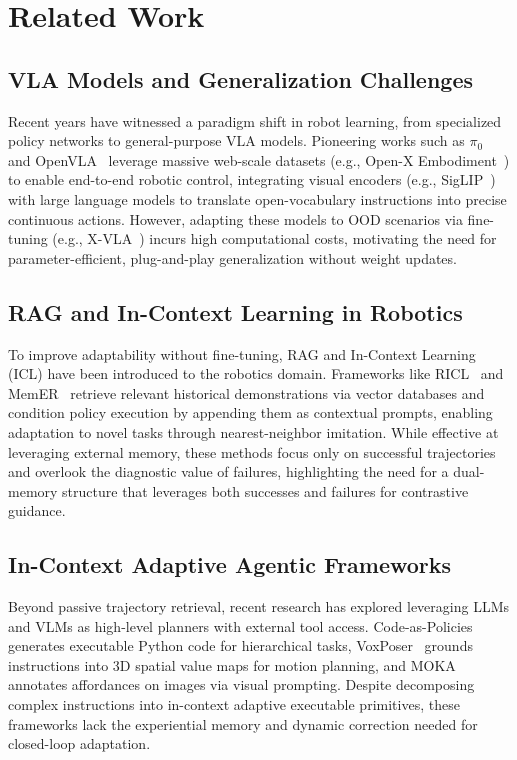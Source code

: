 \section{Related Work}%
\label{sec:related_work}


\subsection{VLA Models and Generalization Challenges}

Recent years have witnessed a paradigm shift in robot learning, from specialized policy networks to general-purpose VLA models.
Pioneering works such as $\pi_0$~\cite{pi0} and OpenVLA~\cite{openvla} leverage massive web-scale datasets 
(e.g., Open-X Embodiment~\cite{openx}) to enable end-to-end robotic control, 
integrating visual encoders (e.g., SigLIP~\cite{siglip}) with large language models 
to translate open-vocabulary instructions into precise continuous actions.
However, adapting these models to OOD scenarios via fine-tuning 
(e.g., X-VLA~\cite{xvla}) incurs high computational costs, 
motivating the need for parameter-efficient, plug-and-play generalization without weight updates.

\subsection{RAG and In-Context Learning in Robotics}

To improve adaptability without fine-tuning, RAG
and In-Context Learning (ICL) have been introduced to the robotics domain.
Frameworks like RICL~\cite{ricl} and MemER~\cite{memer} retrieve relevant historical demonstrations 
via vector databases and condition policy execution by appending them as contextual prompts, 
enabling adaptation to novel tasks through nearest-neighbor imitation.
While effective at leveraging external memory, these methods focus only on successful trajectories and overlook the diagnostic value of failures, highlighting the need for a dual-memory structure that leverages both successes and failures for contrastive guidance.

\subsection{In-Context Adaptive Agentic Frameworks}

Beyond passive trajectory retrieval, recent research has explored leveraging LLMs and 
VLMs as high-level planners with external tool access.
Code-as-Policies~\cite{cap} generates executable Python code for hierarchical tasks, 
VoxPoser~\cite{voxposer} grounds instructions into 3D spatial value maps for motion planning, 
and MOKA~\cite{moka} annotates affordances on images via visual prompting.
Despite decomposing complex instructions into in-context adaptive executable primitives, 
these frameworks lack the experiential memory and dynamic correction needed for closed-loop adaptation.

\endinput
